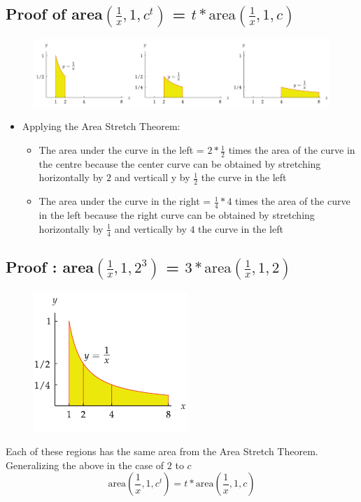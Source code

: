\subsection{Proof of area\( \left( \frac{1}{x}, 1, c^{t} \right) \) = \(t*\text{area}(\frac{1}{x}, 1, c)\)}
\begin{figure}
  \centering
  \includegraphics[scale=0.3]{pics/e_8.png}
\end{figure}
\begin{itemize}
  \item Applying the Area Stretch Theorem:
  \begin{itemize}
    \item The area under the curve in the left  = \(2*\frac{1}{2}\) times the area of the curve in the centre because the center curve can be obtained by stretching horizontally by \(2\) and verticall y by \(\frac{1}{2}\) the curve in the left
  \item The area under the curve in the right  = \(\frac{1}{4}*4\) times the area of the curve in the left because the right curve can be obtained by stretching horizontally by \(\frac{1}{4}\) and vertically by \(4\) the curve in the left
\end{itemize}
\end{itemize}

\subsection{Proof : area\( \left( \frac{1}{x}, 1, 2^{3} \right) \) = \(3*\text{area}(\frac{1}{x}, 1, 2)\)}
\begin{figure}
  \centering
  \includegraphics[scale=0.4]{pics/e_9.png}
\end{figure}
Each of these regions has the same area from the Area Stretch Theorem.
Generalizing the above in the case of \(2\) to \( c \)
\[ \text{area}\left(\frac{1}{x}, 1, c^{t}\right) = t*\text{area}\left(\frac{1}{x}, 1, c\right) \]

